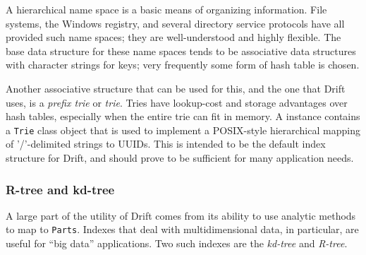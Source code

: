 A hierarchical name space is a basic means of organizing information.  File systems, the Windows
registry, and several directory service protocols have all provided such name spaces; they are
well-understood and highly flexible.  The base data structure for these name spaces tends to be
associative data structures with character strings for keys; very frequently some form of hash table is
chosen.  


\begin{figure}
  \label{fig:trie}
\end{figure}

Another associative structure that can be used for this, and the one that Drift uses, is a
\emph{prefix trie} or \emph{trie}\cite{briandais59:_file}.  Tries have lookup-cost and storage advantages
over hash tables, especially when the entire trie can fit in memory.  A \driftd instance contains a
\texttt{Trie} class object that is used to implement a POSIX-style hierarchical mapping of '/'-delimited
strings to UUIDs.  This is intended to be the default index structure for Drift, and should prove to be
sufficient for many application needs.



\subsubsection{R-tree and kd-tree}

A large part of the utility of Drift comes from its ability to use analytic methods to map to
\texttt{Parts}.  Indexes that deal with multidimensional data, in particular, are useful for ``big data''
applications.  Two such indexes are the \emph{kd-tree}\cite{bentley80:_multid} and
\emph{R-tree}\cite{gutman84:_r,beckmann90:_r}.  

